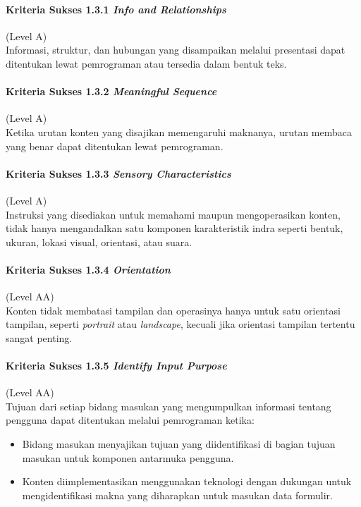 \paragraph{Kriteria Sukses 1.3.1 \textit{Info and Relationships}}
\label{sec:kriteria_sukses_1.3.1}
(Level A)\\

Informasi, struktur, dan hubungan yang disampaikan melalui presentasi dapat ditentukan lewat pemrograman atau tersedia dalam bentuk teks. 

\paragraph{Kriteria Sukses 1.3.2 \textit{Meaningful Sequence}}
\label{sec:kriteria_sukses_1.3.2}
(Level A)\\

Ketika urutan konten yang disajikan memengaruhi maknanya, urutan membaca yang benar dapat ditentukan lewat pemrograman.

\paragraph{Kriteria Sukses 1.3.3 \textit{Sensory Characteristics}}
\label{sec:kriteria_sukses_1.3.3}
(Level A)\\

Instruksi yang disediakan untuk memahami maupun mengoperasikan konten, tidak hanya mengandalkan satu komponen karakteristik indra seperti bentuk, ukuran, lokasi visual, orientasi, atau suara.

\paragraph{Kriteria Sukses 1.3.4 \textit{Orientation}}
\label{sec:kriteria_sukses_1.3.4}
(Level AA)\\

Konten tidak membatasi tampilan dan operasinya hanya untuk satu orientasi tampilan, seperti \textit{portrait} atau \textit{landscape}, kecuali jika orientasi tampilan tertentu sangat penting.

\paragraph{Kriteria Sukses 1.3.5 \textit{Identify Input Purpose}}
\label{sec:kriteria_sukses_1.3.5}
(Level AA)\\

Tujuan dari setiap bidang masukan yang mengumpulkan informasi tentang pengguna dapat ditentukan melalui pemrograman ketika:
\begin{itemize}
	\item Bidang masukan menyajikan tujuan yang diidentifikasi di bagian tujuan masukan untuk komponen antarmuka pengguna.
	\item Konten diimplementasikan menggunakan teknologi dengan dukungan untuk mengidentifikasi makna yang diharapkan untuk masukan data formulir.
\end{itemize}

